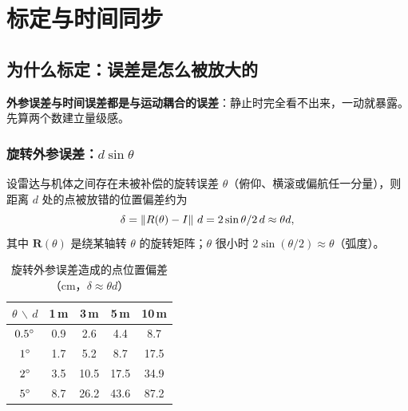 \chapter{标定与时间同步}\label{ch:26-calibration}
\usetikzlibrary{arrows.meta}


\section{为什么标定：误差是怎么被放大的}\label{sec:26-why}

\textbf{外参误差与时间误差都是与运动耦合的误差}：静止时完全看不出来，一动就暴露。先算两个数建立量级感。

\subsection{旋转外参误差：$d\sin\theta$}

设雷达与机体之间存在未被补偿的旋转误差 $\theta$（俯仰、横滚或偏航任一分量），则距离 $d$ 处的点被放错的位置偏差约为
\begin{equation}
\delta=\left\lVert R(\theta)-I \right\rVert\,d=2\sin\theta/2\,d\approx\theta d,
\label{eq:26-leverarm}
\end{equation}
其中 $\bm{R}(\theta)$ 是绕某轴转 $\theta$ 的旋转矩阵；$\theta$ 很小时 $2\sin(\theta/2)\approx\theta$（弧度）。

\begin{table}[htbp]
  \centering
  \caption{旋转外参误差造成的点位置偏差（cm，$\delta\approx\theta d$）}\label{tab:26-rot}
  \small
  \begin{tabular}{ccccc}
    \toprule
    $\theta$ $\backslash$ $d$ & 1\,m & 3\,m & 5\,m & 10\,m \\
    \midrule
    $0.5^\circ$ & 0.9 & 2.6 & 4.4 & 8.7 \\
    $1^\circ$   & 1.7 & 5.2 & 8.7 & 17.5 \\
    $2^\circ$   & 3.5 & 10.5 & 17.5 & 34.9 \\
    $5^\circ$   & 8.7 & 26.2 & 43.6 & 87.2 \\
    \bottomrule
  \end{tabular}
\end{table}

